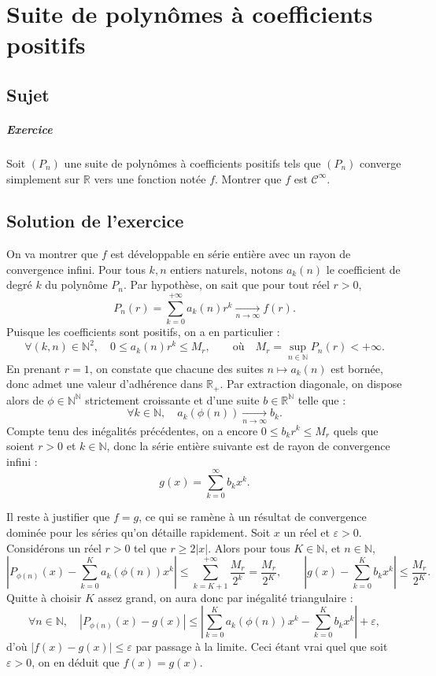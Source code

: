\chapter{Suite de polynômes à coefficients positifs}

\section{Sujet}

\paragraph{Exercice}
Soit $(P_n)$ une suite de polynômes à coefficients positifs tels que $(P_n)$ converge simplement sur $\mathbb R$ vers une fonction notée $f$. Montrer que $f$ est $\mathscr C^\infty$.

\section{Solution de l'exercice} %

On va montrer que $f$ est développable en série entière avec un rayon de convergence infini. Pour tous $k,n$ entiers naturels, notons $a_k(n)$ le coefficient de degré $k$ du polynôme $P_n$. Par hypothèse, on sait que pour tout réel $r > 0$,
\[
P_n(r) = \sum_{k=0}^{+\infty}a_k(n) r^k \xrightarrow[n\to\infty]{} f(r).
\]
Puisque les coefficients sont positifs, on a en particulier :
\[
    \forall (k,n)\in\mathbb N^2,\quad 0 \leqslant a_k(n) r^k \leqslant M_r,
    \qquad\text{où}\quad M_r = \sup_{n\in\mathbb N} P_n(r) < +\infty.
\]
En prenant $r = 1$, on constate que chacune des suites $n \mapsto a_k(n)$ est bornée, donc admet une valeur d'adhérence dans $\mathbb R_+$. Par extraction diagonale, on dispose alors de $\phi \in \mathbb N^{\mathbb N}$ strictement croissante et d'une suite $b \in \mathbb R^\mathbb N$ telle que :
\[
\forall k \in \mathbb N,\quad a_k(\phi(n)) \xrightarrow[n\to\infty]{} b_k.
\]
Compte tenu des inégalités précédentes, on a encore $0 \leqslant b_k r^k \leqslant M_r$ quels que soient $r > 0$ et $k\in \mathbb N$, donc la série entière suivante est de rayon de convergence infini :
\[
    g(x) = \sum_{k=0}^\infty b_k x^k.
\]

Il reste à justifier que $f = g$, ce qui se ramène à un résultat de convergence dominée pour les séries qu'on détaille rapidement. Soit $x$ un réel et $\varepsilon > 0$. 
Considérons un réel $r > 0$ tel que $r \geqslant 2|x|$. Alors pour tous $K \in \mathbb N$, et $n\in \mathbb N$, 
\[
\left|P_{\phi(n)}(x) - \sum_{k=0}^K a_k(\phi(n)) x^k\right| \leqslant \sum_{k=K+1}^{+\infty} \frac{M_r}{2^k} = \frac{M_r}{2^K},
\qquad
\left|g(x) - \sum_{k=0}^K b_k x^k\right| \leqslant \frac{M_r}{2^K}.
\]
Quitte à choisir $K$ assez grand, on aura donc par inégalité triangulaire :
\[
\forall n \in \mathbb N,\quad \left|P_{\phi(n)}(x) - g(x)\right| \leqslant \left|\sum_{k=0}^K a_k(\phi(n))x^k - \sum_{k=0}^K b_k x^k\right| + \varepsilon,
\]
d'où $|f(x)-g(x)| \leqslant \varepsilon$ par passage à la limite. Ceci étant vrai quel que soit $\varepsilon > 0$, on en déduit que $f(x) = g(x)$.

